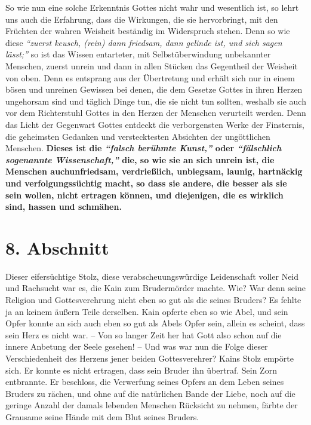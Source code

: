 So wie nun eine solche Erkenntnis Gottes nicht wahr und wesentlich ist, so
lehrt uns auch die Erfahrung, dass die Wirkungen, die sie hervorbringt, mit den
Früchten der wahren Weisheit beständig im Widerspruch stehen. Denn so wie diese
\textit{"`zuerst keusch, (rein) dann friedsam, dann gelinde ist, und sich sagen
lässt;"'}
so ist das Wissen entarteter, mit
Selbstüberwindung
unbekannter Menschen, zuerst unrein und dann in allen Stücken das Gegentheil
der Weisheit von oben. Denn es entsprang aus der Übertretung und erhält sich
nur in einem bösen und unreinen Gewissen bei denen, die
dem Gesetze Gottes in
ihren Herzen ungehorsam sind und täglich Dinge tun, die sie nicht tun
sollten, weshalb sie auch vor dem Richterstuhl Gottes in den Herzen der
Menschen verurteilt werden. Denn das Licht der Gegenwart Gottes entdeckt die
verborgensten Werke der Finsternis, die geheimsten
Gedanken und verstecktesten
Absichten der ungöttlichen
Menschen. \textbf{Dieses ist die
\textit{"`falsch berühmte Kunst,"'} \label{ref:07_07_aroganz}
oder \textit{"`fälschlich sogenannte
Wissenschaft,"'}
die, so wie sie an sich unrein ist, die
Menschen auchunfriedsam, verdrießlich,
unbiegsam, launig, hartnäckig und verfolgungssüchtig macht, so dass sie andere,
die besser als sie sein wollen, nicht ertragen können, und diejenigen, die es
wirklich sind, hassen und schmähen.}

\section{8. Abschnitt} \label{kap7_ab8}

Dieser eifersüchtige Stolz, diese
verabscheuungswürdige Leidenschaft voller Neid
und Rachsucht war es, die Kain zum
Brudermörder machte. Wie? War denn seine
Religion und Gottesverehrung nicht eben so gut als die seines Bruders? Es fehlte
ja an keinem äußern Teile derselben. Kain opferte eben so wie
Abel, und sein
Opfer konnte an sich auch eben so gut als Abels Opfer sein, allein es scheint,
dass sein Herz es nicht war. -- Von so langer Zeit her hat Gott also schon auf
die innere Anbetung der Seele gesehen! -- Und was war nun die Folge dieser
Verschiedenheit des Herzens jener beiden Gottesverehrer? Kains Stolz empörte
sich. Er konnte es nicht ertragen, dass sein Bruder ihn übertraf. Sein Zorn
entbrannte. Er beschloss, die Verwerfung seines Opfers an dem Leben seines
Bruders zu rächen, und ohne auf die natürlichen Bande der Liebe,
noch auf die
geringe Anzahl der damals lebenden Menschen Rücksicht zu nehmen, färbte der
Grausame seine Hände mit dem Blut seines Bruders.

